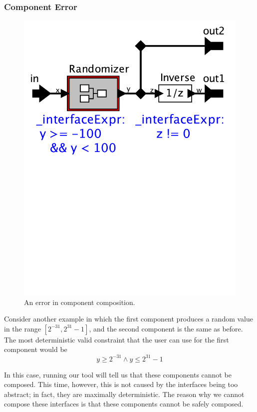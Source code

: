 \documentclass[preprint,11pt]{sigplanconf}
\begin{document}
\subsubsection{Component Error} \label{sec:componentError}
\begin{figure}[htbp]
\centering
\includegraphics[width=\columnwidth]{figs/Randomizer}
\caption{An error in component composition.}
\label{fig:randomError}
\end{figure}

Consider another example in which the first component produces a random value
in the range $[2^{-31}, 2^{31}-1]$, and the second component is the same as
before.
The most deterministic valid constraint that the user can use for the first
component would be
\[
y \ge 2^{-31} \wedge y \le 2^{31}-1
\]

In this case, running our tool will tell us that these components cannot be
composed.
This time, however, this is not caused by the interfaces being too abstract;
in fact, they are maximally deterministic.
The reason why we cannot compose these interfaces is that these components
cannot be safely composed.
\end{document}
